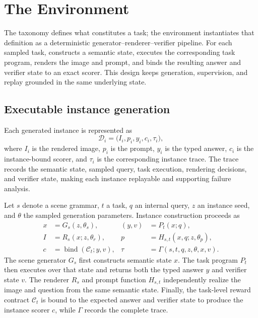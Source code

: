 \section{The \trace Environment}
\label{sec:design}

The taxonomy defines what constitutes a task; the environment instantiates that
definition as a deterministic generator--renderer--verifier pipeline. For each
sampled task, \trace constructs a semantic state, executes the corresponding
task program, renders the image and prompt, and binds the resulting answer and
verifier state to an exact scorer. This design keeps generation, supervision,
and replay grounded in the same underlying state.

\subsection{Executable instance generation}

Each generated instance is represented as
\begin{equation}
  \mathcal{D}_i =
  \bigl(I_i, p_i, y_i, c_i, \tau_i\bigr),
  \label{eq:instance-contract}
\end{equation}
where $I_i$ is the rendered image, $p_i$ is the prompt, $y_i$ is the typed
answer, $c_i$ is the instance-bound scorer, and $\tau_i$ is the corresponding
instance trace. The trace records the semantic state, sampled query, task
execution, rendering decisions, and verifier state, making each instance
replayable and supporting failure analysis.

Let $s$ denote a scene grammar, $t$ a task, $q$ an internal query, $z$ an
instance seed, and $\theta$ the sampled generation parameters. Instance
construction proceeds as
\begin{align}
  x &= G_s(z, \theta_s), &
  (y,v) &= P_t(x;q), \label{eq:semantic-execution}\\
  I &= R_s(x;z,\theta_r), &
  p &= H_{s,t}(x,q;z,\theta_p), \label{eq:render-prompt}\\
  c &= \operatorname{bind}\!\left(\mathcal{C}_t;y,v\right), &
  \tau &= \Gamma(s,t,q,z,\theta,x,v).
  \label{eq:projection-contract}
\end{align}
The scene generator $G_s$ first constructs semantic state $x$. The task
program $P_t$ then executes over that state and returns both the typed answer
$y$ and verifier state $v$. The renderer $R_s$ and prompt function $H_{s,t}$
independently realize the image and question from the same semantic state.
Finally, the task-level reward contract $\mathcal{C}_t$ is bound to the
expected answer and verifier state to produce the instance scorer $c$, while
$\Gamma$ records the complete trace.

